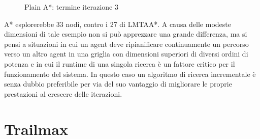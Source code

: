 \documentclass[12pt]{book}
\begin{document}
\begin{figure}[H]
\caption[caption]{Plain A*: termine iterazione 3} \label{fig:A3}
\end{figure}

\par {A* esplorerebbe 33 nodi, contro i 27 di LMTAA*. A causa delle modeste dimensioni di tale esempio non si pu\`o apprezzare una grande differenza, ma si pensi a situazioni in cui un agent deve ripianificare continuamente un percorso verso un altro agent in una griglia con dimensioni superiori di diversi ordini di potenza e in cui il runtime di una singola ricerca \`e un fattore critico per il funzionamento del sistema. In questo caso un algoritmo di ricerca incrementale \`e senza dubbio preferibile per via del suo vantaggio di migliorare le proprie prestazioni al crescere delle iterazioni.}
\section{Trailmax}
\label{sec:trailmax}
\end{document}
